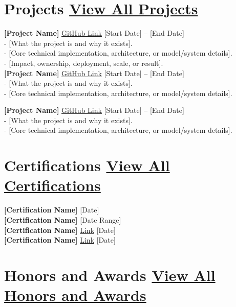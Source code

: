 \documentclass[10pt,letterpaper]{article}
\begin{document}
\section*{Projects \hfill \footnotesize \href{https://www.linkedin.com/in/[linkedin-id]/details/projects/}{View All Projects}}

\textbf{[Project Name]} \href{https://github.com/[github-id]/[project-repo]}{GitHub Link} \hfill [Start Date] -- [End Date] \\
- [What the project is and why it exists]. \\
- [Core technical implementation, architecture, or model/system details]. \\
- [Impact, ownership, deployment, scale, or result]. \\

\textbf{[Project Name]} \href{https://github.com/[github-id]/[project-repo]}{GitHub Link} \hfill [Start Date] -- [End Date] \\
- [What the project is and why it exists]. \\
- [Core technical implementation, architecture, or model/system details].

\textbf{[Project Name]} \href{https://github.com/[github-id]/[project-repo]}{GitHub Link} \hfill [Start Date] -- [End Date] \\
- [What the project is and why it exists]. \\
- [Core technical implementation, architecture, or model/system details].

\section*{Certifications \hfill \footnotesize \href{https://www.linkedin.com/in/[linkedin-id]/details/certifications/}{View All Certifications}}

\textbf{[Certification Name]} \hfill [Date] \\
\textbf{[Certification Name]} \hfill [Date Range] \\
\textbf{[Certification Name]} \href{[credential-link]}{Link} \hfill [Date] \\
\textbf{[Certification Name]} \href{[credential-link]}{Link} \hfill [Date]

\section*{Honors and Awards \hfill \footnotesize \href{https://www.linkedin.com/in/[linkedin-id]/details/honors/}{View All Honors and Awards}}
\end{document}
